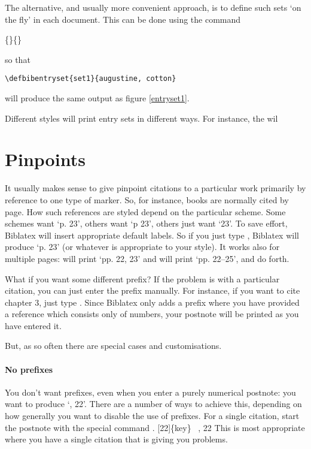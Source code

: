 The alternative, and usually more convenient approach, is to define such sets `on the fly' in each document. This can be done using the command
\begin{pseudoverb}
\centering{}\{\}\{\}
\end{pseudoverb}
so that
\begin{Verbatim}
\defbibentryset{set1}{augustine, cotton}
\end{Verbatim}
will produce the same output as figure \ref{entryset1}.

Different styles will print entry sets in different ways. For instance, the  wil

\section{Pinpoints}

It usually makes sense to give pinpoint citations to a particular work
primarily by reference to one type of marker. So, for instance, books
are normally cited by page. How such references are styled depend on
the particular scheme. Some schemes want `p. 23', others want `p 23',
others just want `23'. To save effort, Biblatex will insert appropriate
default labels. So if you just type , Biblatex will
produce `p. 23'  (or whatever is appropriate to your style). It works
also for multiple pages:  will print `pp. 22, 23'
and  will print `pp. 22--25', and do forth.


What if you want some different prefix? If the problem is with a
particular citation, you can just enter the prefix manually. For
instance, if you want to cite chapter 3, just type
. Since Biblatex only adds a prefix where you have
provided a reference which consists only of numbers, your postnote
will be printed as you have entered it.



 But, as so often there are special cases and
customisations.


\paragraph{No prefixes} You don't want prefixes, even when you enter a
purely numerical postnote: you want  to produce `,
22'. There are a number of ways to achieve this, depending on how
generally you want to disable the use of prefixes.  For a single
citation, start the postnote with the special command .
\marginnote
{{\ttfamily
{}[22]\{key\}} \gives\ , 22}
This is most appropriate where you have a single citation that is
giving you problems.

